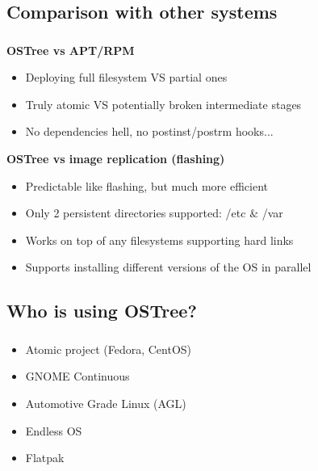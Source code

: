 \subsection{Comparison with other systems}
\begin{frame}
  \frametitle{\insertsubsection}

  \textbf{OSTree vs APT/RPM}
  \begin{itemize}
  \item Deploying full filesystem VS partial ones\vspacing
  \item Truly atomic VS potentially broken intermediate stages\vspacing
  \item No dependencies hell, no postinst/postrm hooks...\vspacing
  \end{itemize}

  \textbf{OSTree vs image replication (flashing)}
  \begin{itemize}
  \item Predictable like flashing, but much more efficient\vspacing
  \item Only 2 persistent directories supported: /etc \& /var\vspacing
  \item Works on top of any filesystems supporting hard links\vspacing
  \item Supports installing different versions of the OS in parallel
  \end{itemize}
\end{frame}

\subsection{Who is using OSTree?}
\begin{frame}
  \frametitle{\insertsubsection}

    \begin{itemize}
      \item Atomic project (Fedora, CentOS)\vspacing
      \item GNOME Continuous\vspacing
      \item Automotive Grade Linux (AGL)\vspacing
      \item Endless OS\vspacing
      \item Flatpak
    \end{itemize}
\end{frame}
